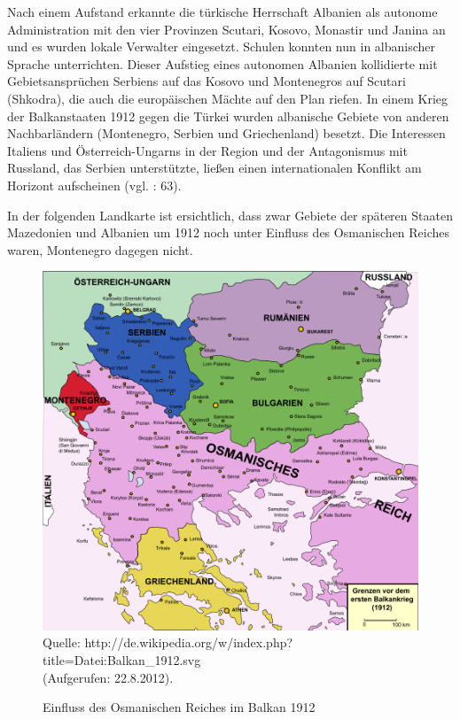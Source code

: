 Nach einem Aufstand erkannte die türkische Herrschaft Albanien als autonome Administration mit den vier Provinzen Scutari, Kosovo, Monastir und Janina an und es wurden lokale Verwalter eingesetzt. Schulen konnten nun in albanischer Sprache unterrichten. Dieser Aufstieg eines autonomen Albanien kollidierte mit Gebietsansprüchen Serbiens auf das Kosovo und Montenegros auf Scutari (Shkodra), die auch die europäischen Mächte auf den Plan riefen. In einem Krieg der Balkanstaaten 1912 gegen die Türkei wurden albanische Gebiete von anderen Nachbarländern (Montenegro, Serbien und Griechenland) besetzt. Die Interessen Italiens und Österreich-Ungarns in der Region und der Antagonismus mit Russland, das Serbien unterstützte, ließen einen internationalen Konflikt am Horizont aufscheinen (vgl. \cite{chek}: 63).\par
 In der folgenden Landkarte ist ersichtlich, dass zwar Gebiete der späteren Staaten Mazedonien
und Albanien um 1912 noch unter Einfluss des Osmanischen Reiches waren,
Montenegro dagegen nicht.
\begin{figure}[H]
  \centering
\setlength\belowcaptionskip{10pt}
  \caption{Einfluss des Osmanischen Reiches im Balkan 1912}
  \includegraphics[width=5in]{Material/Balkan_1912}\\
\vspace{10pt}
Quelle: http://de.wikipedia.org/w/index.php?title=Datei:Balkan\_1912.svg\\ (Aufgerufen: 22.8.2012).
\end{figure}

